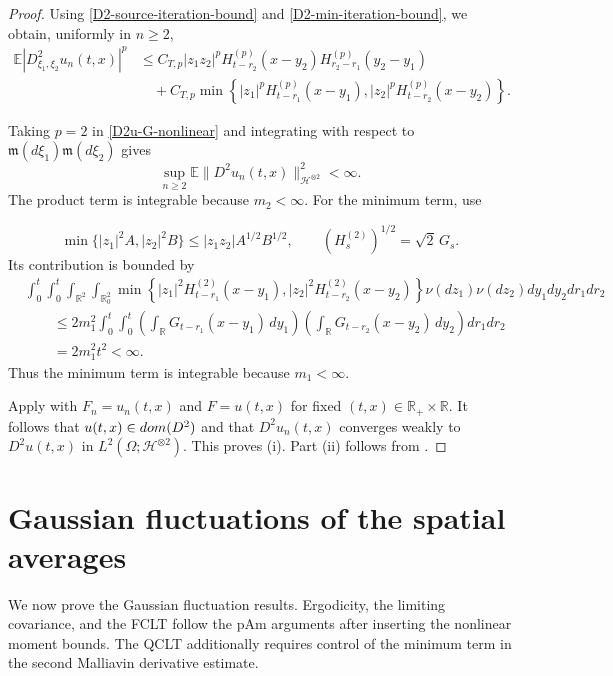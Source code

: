 \documentclass[10pt,a4paper]{amsart}
\def\cH{\mathcal{H}}
\def\bE{\mathbb{E}}
\def\bR{\mathbb{R}}
\newcommand{\fm}{\mathfrak{m}}
\begin{document}
\begin{proof}
Using \eqref{D2-source-iteration-bound} and
\eqref{D2-min-iteration-bound}, we obtain, uniformly in $n\ge2$,
\begin{align}
\label{D2u-G-nonlinear}
\bE\left|D^2_{\xi_1,\xi_2}u_n(t,x)\right|^p
&\le
C_{T,p}|z_1z_2|^p
H_{t-r_2}^{(p)}(x-y_2)
H_{r_2-r_1}^{(p)}(y_2-y_1)
\nonumber\\
&\quad+
C_{T,p}
\min\left\{
|z_1|^pH_{t-r_1}^{(p)}(x-y_1),
|z_2|^pH_{t-r_2}^{(p)}(x-y_2)
\right\}.
\end{align}



Taking $p=2$ in \eqref{D2u-G-nonlinear} and integrating with respect to
$\fm(d\xi_1)\fm(d\xi_2)$ gives
\[
\sup_{n\ge2}
\bE\|D^2u_n(t,x)\|_{\cH^{\otimes2}}^2<\infty.
\]
The product term is integrable because $m_2<\infty$. For the minimum
term, use

\[
\min\{|z_1|^2A,|z_2|^2B\}\le |z_1z_2|A^{1/2}B^{1/2},
\qquad (H_s^{(2)})^{1/2}=\sqrt2\,G_s.
\]
Its contribution is bounded by
\[
\begin{aligned}
&\int_0^t\int_0^t\int_{\bR^2}\int_{\bR_0^2}
\min\left\{|z_1|^2H_{t-r_1}^{(2)}(x-y_1),
|z_2|^2H_{t-r_2}^{(2)}(x-y_2)\right\}
\nu(dz_1)\nu(dz_2)dy_1dy_2dr_1dr_2 \\
&\qquad\le
2m_1^2
\int_0^t\int_0^t
\left(\int_{\bR}G_{t-r_1}(x-y_1)\,dy_1\right)
\left(\int_{\bR}G_{t-r_2}(x-y_2)\,dy_2\right)
dr_1dr_2  \\
&\qquad=
2m_1^2t^2
<\infty .
\end{aligned}
\]
 Thus the minimum term is integrable because $m_1<\infty$.





\medskip
Apply \cite[Lemma~2.1]{BLW26} with $F_n=u_n(t,x)$ and $F=u(t,x)$
for fixed $(t,x)\in\bR_+\times\bR$. It follows that
$u(t,x)\in{\rm dom}(D^2)$ and that $D^2u_n(t,x)$ converges weakly to
$D^2u(t,x)$ in $L^2(\Omega;\cH^{\otimes2})$. This proves (i). Part (ii)
follows from \cite[Lemma~A.1]{BS26}.
\end{proof}



\section{Gaussian fluctuations of the spatial averages}
\label{sec:Gaussian-fluctuations}

We now prove the Gaussian fluctuation results. Ergodicity, the limiting
covariance, and the FCLT follow the pAm arguments after inserting the nonlinear
moment bounds. The QCLT additionally requires control of the minimum term in
the second Malliavin derivative estimate.
\end{document}
